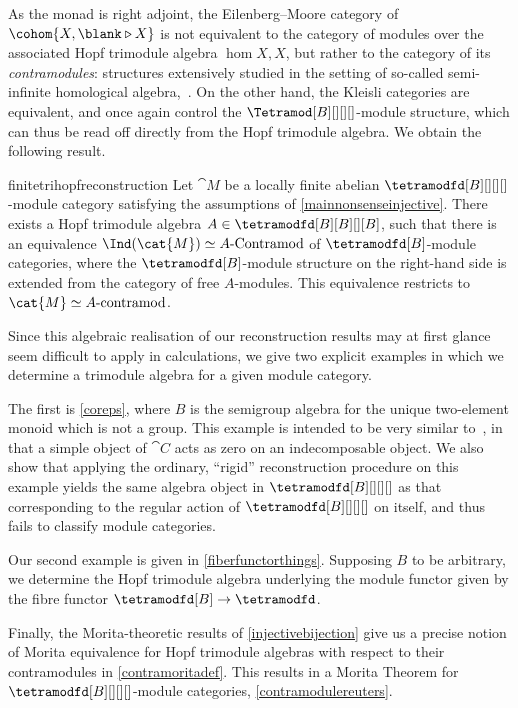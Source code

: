 As the monad is right adjoint,
the Eilenberg–Moore category of \(\cohom{X,\blank \triangleright X}\) is not equivalent to the category of modules over the associated Hopf trimodule algebra \(\hom{X,X}\),
but rather to the category of its \emph{contramodules}:
structures extensively studied in the setting of so-called semi-infinite homological algebra,~\cite{positselski10:homol}.
On the other hand, the Kleisli categories are equivalent,
and once again control the \(\Tetramod[B][][][]\)\hyp{}module structure,
which can thus be read off directly from the Hopf trimodule algebra.
We obtain the following result.

\begin{reptheorem}{finitetrihopfreconstruction}
  Let \(\cat{M}\) be a locally finite abelian \(\tetramodfd[B][][][]\)\hyp{}module category
  satisfying the assumptions of \cref{mainnonsenseinjective}.
  There exists a Hopf trimodule algebra \(A \in \tetramodfd[B][B][][B]\),
  such that there is an equivalence
  \(\Ind(\cat{M}) \simeq A\textnormal{-Contramod}\)
  of \(\tetramodfd[B]\)\hyp{}module categories,
  where the \(\tetramodfd[B]\)\hyp{}module structure on the right-hand side is extended from the category of free \(A\)\hyp{}modules.
  This equivalence restricts to \(\cat{M} \simeq A\textnormal{-contramod}\).
\end{reptheorem}

Since this algebraic realisation of our reconstruction results may at first glance seem difficult to apply in calculations,
we give two explicit examples in which we determine a trimodule algebra for a given module category.

The first is \cref{coreps}, where \(B\) is the semigroup algebra for the unique two-element monoid which is not a group.
This example is intended to be very similar to~\cite[Example~2.20]{douglas19},
in that a simple object of \(\cat{C}\) acts as zero on an indecomposable object.
We also show that applying the ordinary,
``rigid'' reconstruction procedure on this example yields the same algebra object in \(\tetramodfd[B][][][]\)
as that corresponding to the regular action of \(\tetramodfd[B][][][]\) on itself,
and thus fails to classify module categories.

Our second example is given in \cref{fiberfunctorthings}.
Supposing \(B\) to be arbitrary,
we determine the Hopf trimodule algebra underlying the module functor
given by the fibre functor \(\tetramodfd[B] \to \tetramodfd\).

Finally, the Morita-theoretic results of \cref{injectivebijection} give us a precise notion of Morita equivalence for Hopf trimodule algebras
with respect to their contramodules in \cref{contramoritadef}.
This results in a Morita Theorem for \(\tetramodfd[B][][][]\)\hyp{}module categories, \cref{contramodulereuters}.

